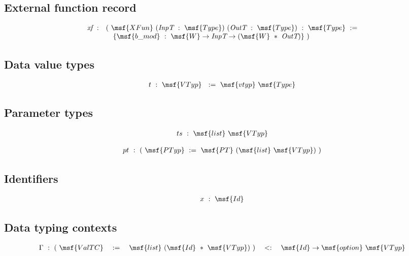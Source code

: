 \documentclass{article}
\begin{document}
\subsection{External function record}

\begin{gather}
\begin{array}{lll}  
  \mbox{\it xf} \ : & (\ \msf{XFun} \ (\mbox{\it InpT} \ : \ \msf{Type}) \
           (\mbox{\it OutT} \ : \ \msf{Type}) \ : \
  \msf{Type} \ := \\
  & \quad \{ \msf{b\_mod} \ : \ \msf{W} \to \mbox{\it InpT} \to (\msf{W} \ * \ \mbox{\it OutT}) \} \ )
\end{array}  
\end{gather}



\subsection{Data value types}

\begin{gather}
t \ : \ \msf{VTyp} \ \ := \ \msf{vtyp} \ \msf{Type}
\end{gather}




\subsection{Parameter types}


\begin{gather}
  ts \ : \ \msf{list} \ \msf{VTyp}
\end{gather}


\begin{gather}
  pt \ : \ ( \ \msf{PTyp} \ := \ \msf{PT} \ (\msf{list} \ \msf{VTyp}) \ )
\end{gather}


\subsection{Identifiers}

\begin{gather}
  x \ : \ \msf{Id} 
\end{gather}


\subsection{Data typing contexts}

\begin{gather}
  \begin{array}{lll}
\Gamma \ : \ ( \ \msf{ValTC} \quad := \quad \msf{list} \ (\msf{Id} \ *
\ \msf{VTyp}) \ ) \quad <: \quad  \msf{Id} \to \msf{option} \ \msf{VTyp}
\end{array}
\end{gather}  
\end{document}
